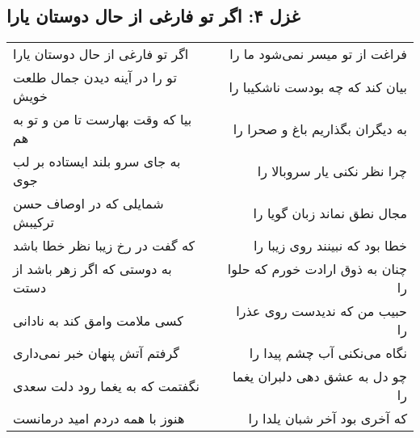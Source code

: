 \begin{center}
\section*{غزل ۴: اگر تو فارغی از حال دوستان یارا}
\label{sec:004}
\begin{longtable}{l p{0.5cm} r}
اگر تو فارغی از حال دوستان یارا
&&
فراغت از تو میسر نمی‌شود ما را
\\
تو را در آینه دیدن جمال طلعت خویش
&&
بیان کند که چه بودست ناشکیبا را
\\
بیا که وقت بهارست تا من و تو به هم
&&
به دیگران بگذاریم باغ و صحرا را
\\
به جای سرو بلند ایستاده بر لب جوی
&&
چرا نظر نکنی یار سروبالا را
\\
شمایلی که در اوصاف حسن ترکیبش
&&
مجال نطق نماند زبان گویا را
\\
که گفت در رخ زیبا نظر خطا باشد
&&
خطا بود که نبینند روی زیبا را
\\
به دوستی که اگر زهر باشد از دستت
&&
چنان به ذوق ارادت خورم که حلوا را
\\
کسی ملامت وامق کند به نادانی
&&
حبیب من که ندیدست روی عذرا را
\\
گرفتم آتش پنهان خبر نمی‌داری
&&
نگاه می‌نکنی آب چشم پیدا را
\\
نگفتمت که به یغما رود دلت سعدی
&&
چو دل به عشق دهی دلبران یغما را
\\
هنوز با همه دردم امید درمانست
&&
که آخری بود آخر شبان یلدا را
\\
\end{longtable}
\end{center}
